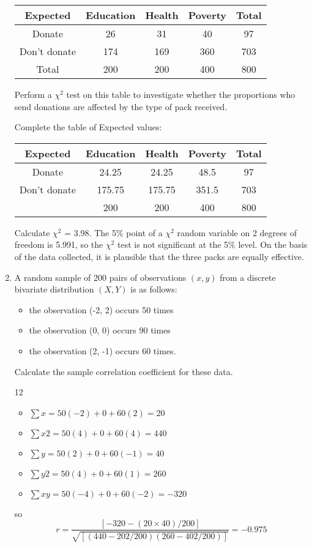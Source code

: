 \documentclass[a4paper,12pt]{article}
\begin{document}
\begin{enumerate}
\begin{center}
\begin{tabular}{|c|c|c|c|c|}\hline
Expected 	&	Education 	&	Health 	&	Poverty 	&	Total	\\ \hline
Donate & 26 & 31 & 40 & 97 \\ \hline
Don’t donate  & 174 & 169& 360&  703\\ \hline
Total	&	200	&	200	&	400	&	800	\\ \hline
\end{tabular}
\end{center}

Perform a $\chi^2$ test on this table to investigate whether the proportions who
send donations are affected by the type of pack received. 

\medskip 
Complete the table of Expected values:
\begin{center}
\begin{tabular}{|c|c|c|c|c|}\hline
Expected 	&	Education 	&	Health 	&	Poverty 	&	Total	\\ \hline
Donate 	&	24.25	&	24.25	&	48.5	&	97	\\ \hline
Don’t donate	&	175.75	&	175.75	&	351.5	&	703	\\ \hline
	&	200	&	200	&	400	&	800	\\ \hline
\end{tabular}
\end{center}

Calculate $\chi^2$ = 3.98.
The 5\% point of a $\chi^2$ random variable on 2 degrees of freedom is 5.991,
so the $\chi^2$ test is not significant at the 5\% level.
On the basis of the data collected, it is plausible that the three packs are equally
effective.
\newpage
\item A random sample of 200 pairs of observations $(x, y)$ from a discrete bivariate
distribution $(X, Y)$ is as follows:
\begin{itemize}
    \item the observation (-2, 2) occurs 50 times
\item the observation (0, 0) occurs 90 times
\item the observation (2, -1) occurs 60 times.
\end{itemize}

Calculate the sample correlation coefficient for these data.


12
\begin{itemize}
    \item $\sum x = 50(-2) + 0 + 60(2) = 20$
    \item $\sum x2 = 50(4) + 0 + 60(4) = 440$
\item $\sum y = 50(2) + 0 + 60(-1) = 40$ 
\item $\sum y2 = 50(4) + 0 + 60(1) = 260$
\item $\sum xy = 50(-4) + 0 + 60(-2) = -320$
\end{itemize}
so\[ r = \frac{[-320 - (20 \times 40)/200]}{ \sqrt{ [(440 - 202/200)(260 - 402/200)]}} = -0.975\]
\end{enumerate}
\end{document}
